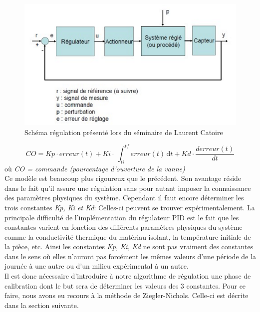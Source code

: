 \documentclass[12pt]{report}
\begin{document}
\begin{figure}[H]
\centering
\includegraphics[scale = 0.8]{Regulateur.PNG}
\caption{\label{regulateur} Schéma régulation présenté lors du séminaire de Laurent Catoire}
\end{figure}

\begin{equation}
CO = Kp \cdot erreur(t) + Ki \cdot\ \int_{ti}^{tf}  erreur(t) \, \mathrm dt + Kd \cdot \frac{derreur(t)}{dt}
\label{eq1}
\end{equation}
où \emph{ CO = commande (pourcentage d'ouverture de la vanne)}\\


Ce modèle est beaucoup plus rigoureux que le précédent. Son avantage réside dans le fait qu'il assure une régulation sans pour autant imposer la connaissance des paramètres physiques du système.
Cependant il faut encore déterminer les trois constantes \emph{Kp, Ki et Kd}: Celles-ci peuvent se trouver expérimentalement. La principale difficulté de l'implémentation du régulateur PID est le fait que les constantes varient en fonction des différents paramètres physiques du système comme la conductivité thermique du matériau isolant, la température initiale de la pièce, etc. Ainsi les constantes \emph{Kp, Ki, Kd} ne sont pas vraiment des constantes dans le sens où elles n'auront pas forcément les mêmes valeurs d'une période de la journée à une autre ou d'un milieu expérimental à un autre.\\
Il est donc nécessaire d'introduire à notre algorithme de régulation une phase de calibration dont le but sera de déterminer les valeurs des 3 constantes. Pour ce faire, nous avons eu recours à la méthode de Ziegler-Nichols\cite{_commande_????}. Celle-ci est décrite dans la section suivante.\\
\end{document}
